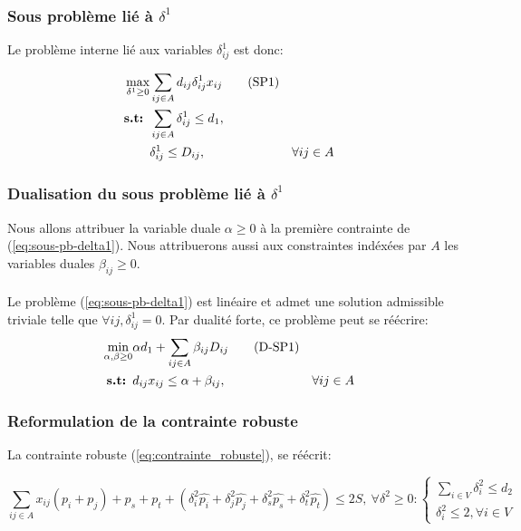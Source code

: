 \documentclass{article}
\begin{document}
\subsubsection{Sous problème lié à $\delta^{1}$}

Le problème interne lié aux variables $\delta^{1}_{ij}$ est donc:

\begin{align}
  \max_{\delta^{1}\geq 0} & \sum_{ij \in A} d_{ij} \delta_{ij}^{1} x_{ij} \tag{SP1} \label{eq:sous-pb-delta1}  \\
  \textbf{s.t: } &\sum_{ij \in A} \delta_{ij}^{1} \leq d_1, \notag \\
  &\delta_{ij}^{1} \leq D_{ij}, && \forall ij \in A \notag
\end{align}

\subsubsection{Dualisation du sous problème lié à $\delta^{1}$}

Nous allons attribuer la variable duale $\alpha \geq 0$ à la première contrainte de (\ref{eq:sous-pb-delta1}). Nous attribuerons aussi aux constraintes indéxées par $A$ les variables duales $\beta_{ij} \geq 0$.
\\
\\
Le problème (\ref{eq:sous-pb-delta1}) est linéaire et admet une solution admissible triviale telle que $\forall ij, \delta^{1}_{ij} = 0$. Par dualité forte, ce problème peut se réécrire:
\begin{align}
  \min_{\alpha, \beta \geq 0} & \alpha d_1  + \sum_{ij \in A} \beta_{ij} D_{ij} \tag{D-SP1} \label{eq:dual-sous-pb-delta1}  \\
  \textbf{s.t: } &d_{ij} x_{ij} \leq \alpha + \beta_{ij}, && \forall ij \in A \notag
\end{align}

\subsubsection{Reformulation de la contrainte robuste}

La contrainte robuste (\ref{eq:contrainte_robuste}), se réécrit:

\begin{equation}
\label{eq:ref_contrainte_robuste}
  \sum_{ij \in A} x_{ij}(p_i + p_j) + p_s + p_t +  (\delta_{i}^{2} \hat{p_i} + \delta_{j}^{2} \hat{p_j} + \delta_{s}^{2} \hat{p_s} + \delta_{t}^{2} \hat{p_t}) \leq 2S,\ \forall \delta^{2} \geq 0: 
\begin{cases}
  \sum_{i \in V} \delta^{2}_{i} \leq d_2 \\
  \delta^{2}_{i} \leq 2, \forall i \in V 
\end{cases} 
\end{equation}
\end{document}
